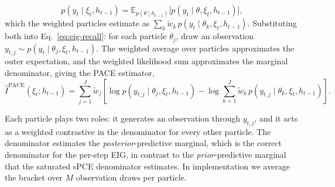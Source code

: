 \begin{equation}
\label{eq:postpred}
p(y_t\mid\xi_t,h_{t-1})=\mathbb{E}_{p(\theta\mid h_{t-1})}\big[p(y_t\mid\theta,\xi_t,h_{t-1})\big],
\end{equation}
which the weighted particles estimate as $\sum_k\tilde w_k\,p(y_t\mid\theta_k,\xi_t,h_{t-1})$. Substituting both into Eq.~\eqref{eq:eig-recall}: for each particle $\theta_j$, draw an observation $y_{t,j}\sim p(y_t\mid\theta_j,\xi_t,h_{t-1})$. The weighted average over particles approximates the outer expectation, and the weighted likelihood sum approximates the marginal denominator, giving the PACE estimator,
\begin{equation}
\label{eq:pace}
\hat I^{\mathrm{PACE}}(\xi_t;h_{t-1})
= \sum_{j=1}^{J}\tilde w_j
\left[\log p(y_{t,j}\mid\theta_j,\xi_t,h_{t-1})
- \log\sum_{k=1}^{J}\tilde w_k\,p(y_{t,j}\mid\theta_k,\xi_t,h_{t-1})\right].
\end{equation}


Each particle plays two roles: it generates an observation through $y_{t,j}$, and it acts as a weighted contrastive in the denominator for every other particle. The denominator estimates the \emph{posterior}-predictive marginal, which is the correct denominator for the per-step EIG, in contrast to the \emph{prior}-predictive marginal that the saturated sPCE denominator estimates. In implementation we average the bracket over $M$ observation draws per particle.



